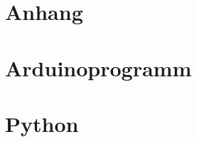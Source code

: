 \section*{Anhang}
\appendix
\startcontents[sections]
\clearpage
\pagebreak


%
%








\section{Arduinoprogramm}\label{app:ardprog}


\section{Python}\label{app:python}


